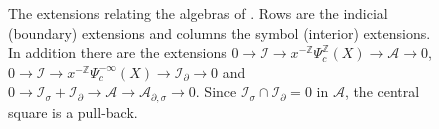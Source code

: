 \documentclass[11pt,oneside,reqno]{article}
\DeclareMathOperator{\In}{In}
\newcommand{\Z}{\mathbb Z}
\newcommand{\cA}{\mathcal A}
\newcommand{\cI}{\mathcal I}
\newcommand{\Is}{\mathcal I_\sigma}
\newcommand{\Id}{\mathcal I_\partial}
\newcommand{\As}{\mathcal A_\sigma}
\newcommand{\Ad}{\mathcal A_\partial}
\newcommand{\Ads}{\mathcal A_{\partial,\sigma}}
\newcommand{\Psic}{\Psi_{c}}
\theoremstyle{plain}
\theoremstyle{definition}
\theoremstyle{remark}
\begin{document}
\begin{figure}[htbp]
\centering
{}
\caption[The diagram of extensions]{The extensions relating the algebras of
\cite{MN}. Rows are the indicial (boundary) extensions and columns the
symbol (interior) extensions. In addition there are the extensions
\(0\to\cI\to x^{-\Z}\Psic^{\Z}(X)\to\cA\to0\),
\(0\to\cI\to x^{-\Z}\Psic^{-\infty}(X)\to\Id\to0\) and
\(0\to\Is+\Id\to\cA\to\Ads\to0\). Since \(\Is\cap\Id=0\) in \(\cA\), the
central square is a pull-back.}
\label{fig:extensions}
\end{figure}
\end{document}
